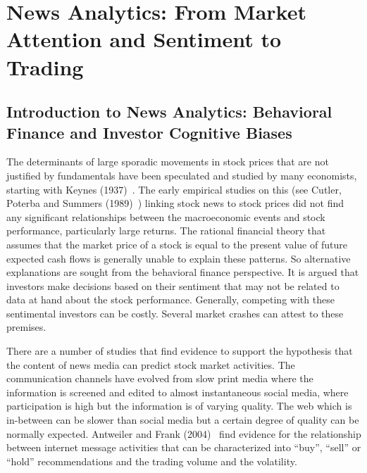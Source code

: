 \chapter{News Analytics: From Market Attention and Sentiment to Trading \label{chap:ch_news_an}}
\section{Introduction to News Analytics: Behavioral Finance and Investor Cognitive Biases}
 
 The determinants of large sporadic movements in stock prices that are not justified by fundamentals have been speculated and studied by many economists, starting with Keynes (1937)~\cite{keynes1937general}. The early empirical studies on this (see Cutler, Poterba and Summers (1989)~\cite{cutler1988moves}) linking stock news to stock prices did not find any significant relationships between the macroeconomic events and stock performance, particularly large returns. The rational financial theory that assumes that the market price of a stock is equal to the present value of future expected cash flows is generally unable to explain these patterns. So alternative explanations are sought from the behavioral finance perspective. It is argued that investors make decisions based on their sentiment that may not be related to data at hand about the stock performance. Generally, competing with these sentimental investors can be costly. Several market crashes can attest to these premises.
 
 
 There are a number of studies that find evidence to support the hypothesis that the content of news media can predict stock market activities. The communication channels have evolved from slow print media where the information is screened and edited to almost instantaneous social media, where participation is high but the information is of varying quality. The web which is in-between can be slower than social media but a certain degree of quality can be normally expected. Antweiler and Frank (2004)~\cite{antweiler2004all} find evidence for the relationship between internet message activities that can be characterized into ``buy'', ``sell'' or ``hold'' recommendations and the trading volume and the volatility.
 
